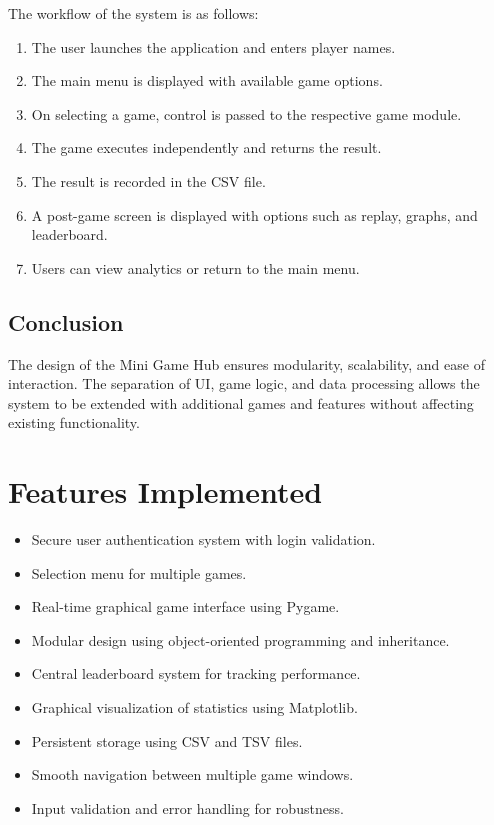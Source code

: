 \documentclass[12pt]{article}
\begin{document}
The workflow of the system is as follows:

\begin{enumerate}
    \item The user launches the application and enters player names.
    \item The main menu is displayed with available game options.
    \item On selecting a game, control is passed to the respective game module.
    \item The game executes independently and returns the result.
    \item The result is recorded in the CSV file.
    \item A post-game screen is displayed with options such as replay, graphs, and leaderboard.
    \item Users can view analytics or return to the main menu.
\end{enumerate}

\subsection{Conclusion}

The design of the Mini Game Hub ensures modularity, scalability, and ease of interaction. The separation of UI, game logic, and data processing allows the system to be extended with additional games and features without affecting existing functionality.
\section{Features Implemented}

\begin{itemize}

\item Secure user authentication system with login validation.
\item Selection menu for multiple games.
\item Real-time graphical game interface using Pygame.
\item Modular design using object-oriented programming and inheritance.
\item Central leaderboard system for tracking performance.
\item Graphical visualization of statistics using Matplotlib.
\item Persistent storage using CSV and TSV files.
\item Smooth navigation between multiple game windows.
\item Input validation and error handling for robustness.

\end{itemize}
\end{document}
